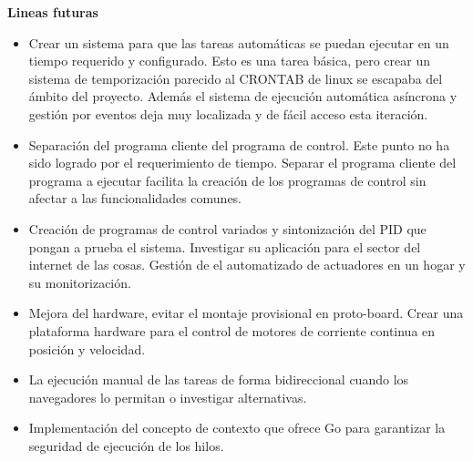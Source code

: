 \textbf{Lineas futuras}

\begin{itemize}
    \item Crear un sistema para que las tareas automáticas se puedan ejecutar en un tiempo requerido y configurado.
    Esto es una tarea básica, pero crear un sistema de temporización parecido al CRONTAB de linux se escapaba del ámbito del proyecto.
    Además el sistema de ejecución automática asíncrona y gestión por eventos deja muy localizada y de fácil acceso esta iteración.
    \item Separación del programa cliente del programa de control.
    Este punto no ha sido logrado por el requerimiento de tiempo.
    Separar el programa cliente del programa a ejecutar facilita la creación de los programas de control sin afectar a las funcionalidades comunes.
    \item Creación de programas de control variados y sintonización del PID que pongan a prueba el sistema.
    Investigar su aplicación para el sector del internet de las cosas.
    Gestión de el automatizado de actuadores en un hogar y su monitorización.
    \item Mejora del hardware, evitar el montaje provisional en proto-board.
    Crear una plataforma hardware para el control de motores de corriente continua en posición y velocidad.
    \item La ejecución manual de las tareas de forma bidireccional cuando los navegadores lo permitan o investigar alternativas.
    \item Implementación del concepto de contexto que ofrece Go para garantizar la seguridad de ejecución de los hilos.
\end{itemize}
